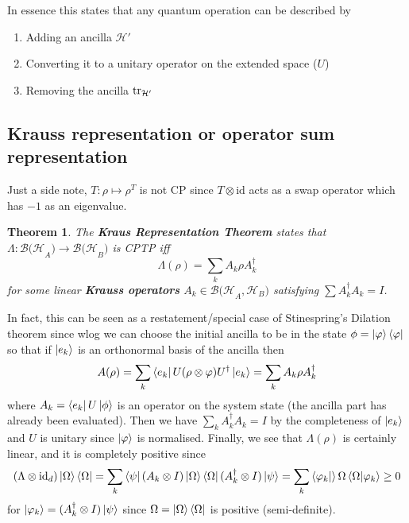 \documentclass{article}
\newtheorem{theorem}{Theorem}
\theoremstyle{definition}
\newcommand{\id}{\text{id}}
\begin{document}
In essence this states that any quantum operation can be described by

\begin{enumerate}
  \item Adding an ancilla $\mathcal{H'}$
  \item Converting it to a unitary operator on the extended space ($U$)
  \item Removing the ancilla $\tr_{\mathcal{H'}}$
\end{enumerate}

\subsection{Krauss representation or operator sum representation}

Just a side note, $T : \rho \mapsto \rho^T$ is not CP since $T \otimes \id$
acts as a swap operator which has $-1$ as an eigenvalue.

\begin{theorem}
  The \textbf{Kraus Representation Theorem} states that $\Lambda : 
  \mathcal{B(H}_A) \to \mathcal{B(H}_B)$ is CPTP iff 
  \begin{equation}
    \Lambda(\rho) = \sum_k A_k \rho A_k^\dagger
  \end{equation}
  for some linear \textbf{Krauss operators} $A_k \in \mathcal{B(H}_A, 
  \mathcal{H}_B)$ satisfying $\sum A_k^\dagger A_k = I$.
\end{theorem}

In fact, this can be seen as a restatement/special case of Stinespring's
Dilation theorem since wlog we can choose the initial ancilla to be in the
state $\phi = \ket{\varphi} \bra{\varphi}$ so that if $\ket{e_k}$ is an 
orthonormal basis of the ancilla then
\begin{equation}
  A(\rho) = \sum_k \bra{e_k} U (\rho \otimes \varphi) U^\dagger \ket{e_k}
  = \sum_k A_k \rho A_k^\dagger
\end{equation}
where $A_k = \bra{e_k} U \ket{\phi}$ is an operator on the system state
(the ancilla part has already been evaluated). Then we have $\sum_k 
A_k^\dagger A_k = I$ by the completeness of $\ket{e_k}$ and $U$ is unitary
since $\ket\varphi$ is normalised. Finally, we see that $\Lambda(\rho)$ is 
certainly linear, and it is completely positive since
\begin{equation}
  (\Lambda \otimes \id_d) \ket\Omega \bra\Omega = \sum_k \bra\psi (A_k
  \otimes I) \ket\Omega \bra\Omega (A_k^\dagger \otimes I) \ket\psi =
  \sum_k \bra{\varphi_k} \ket\Omega \bra\Omega \ket{\varphi_k} \geq 0
\end{equation}
for $\ket{\varphi_k} = (A_k^\dagger \otimes I) \ket\psi$ since $\Omega =
\ket\Omega \bra\Omega$ is positive (semi-definite).
\end{document}
